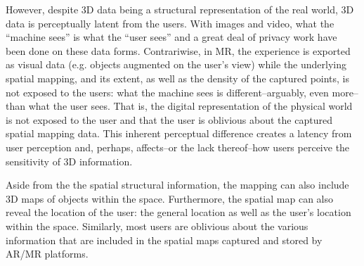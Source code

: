 However, despite 3D data being a structural representation of the real world, 3D data is perceptually latent from the users. With images and video, what the ``machine sees'' is what the ``user sees'' and a great deal of privacy work have been done on these data forms. Contrariwise, in MR, the experience is exported as visual data (e.g. objects augmented on the user's view) while the underlying spatial mapping, and its extent, as well as the density of the captured points, is not exposed to the users: what the machine sees is different--arguably, even more--than what the user sees. That is, the digital representation of the physical world is not exposed to the user and that the user is oblivious about the captured spatial mapping data. This inherent perceptual difference creates a latency from user perception and, perhaps, affects--or the lack thereof--how users perceive the sensitivity of 3D information.

Aside from the the spatial structural information, the mapping can also include 3D maps of objects within the space. Furthermore, the spatial map can also reveal the location of the user: the general location as well as the user's location within the space. Similarly, most users are oblivious about the various information that are included in the spatial maps captured and stored by AR/MR platforms.

